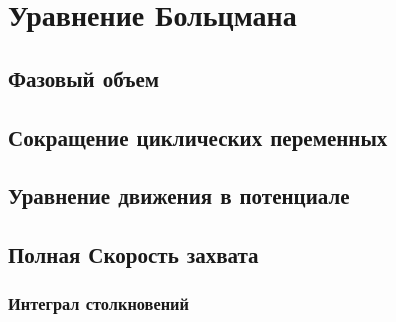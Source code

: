 


	
	\section{Уравнение Больцмана}
	\subsection{Фазовый объем}
	
	\subsection{Сокращение циклических переменных}
	
	\subsection{Уравнение движения в потенциале}
	
	\subsection{Полная Скорость захвата}
		
	\subsubsection{Интеграл столкновений}
	
	
